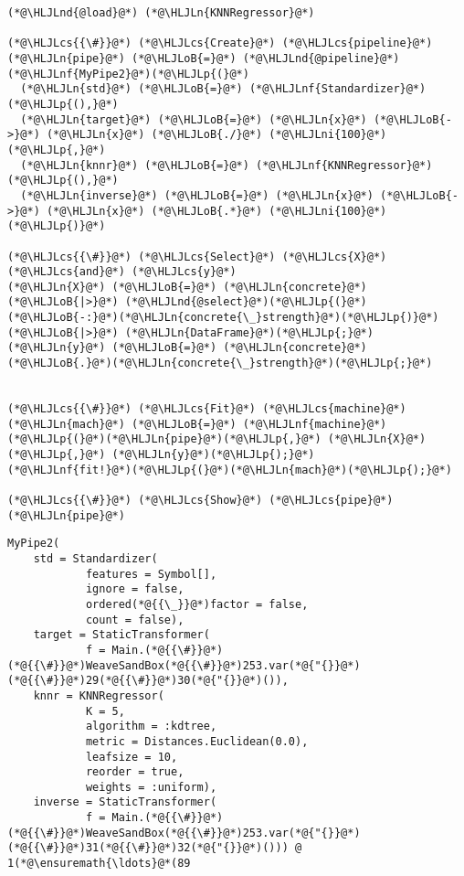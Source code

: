 \documentclass[12pt,a4paper]{article}
\newcommand{\HLJLn}[1]{#1}
\newcommand{\HLJLnd}[1]{\textcolor[RGB]{214,102,97}{#1}}
\newcommand{\HLJLnf}[1]{\textcolor[RGB]{66,102,213}{#1}}
\newcommand{\HLJLni}[1]{\textcolor[RGB]{59,151,46}{#1}}
\newcommand{\HLJLoB}[1]{\textcolor[RGB]{102,102,102}{\textbf{#1}}}
\newcommand{\HLJLp}[1]{#1}
\newcommand{\HLJLcs}[1]{\textcolor[RGB]{153,153,119}{\textit{#1}}}
\begin{document}
\begin{lstlisting}
(*@\HLJLnd{@load}@*) (*@\HLJLn{KNNRegressor}@*) 

(*@\HLJLcs{{\#}}@*) (*@\HLJLcs{Create}@*) (*@\HLJLcs{pipeline}@*)
(*@\HLJLn{pipe}@*) (*@\HLJLoB{=}@*) (*@\HLJLnd{@pipeline}@*) (*@\HLJLnf{MyPipe2}@*)(*@\HLJLp{(}@*)
  (*@\HLJLn{std}@*) (*@\HLJLoB{=}@*) (*@\HLJLnf{Standardizer}@*)(*@\HLJLp{(),}@*)
  (*@\HLJLn{target}@*) (*@\HLJLoB{=}@*) (*@\HLJLn{x}@*) (*@\HLJLoB{->}@*) (*@\HLJLn{x}@*) (*@\HLJLoB{./}@*) (*@\HLJLni{100}@*)(*@\HLJLp{,}@*) 
  (*@\HLJLn{knnr}@*) (*@\HLJLoB{=}@*) (*@\HLJLnf{KNNRegressor}@*)(*@\HLJLp{(),}@*)
  (*@\HLJLn{inverse}@*) (*@\HLJLoB{=}@*) (*@\HLJLn{x}@*) (*@\HLJLoB{->}@*) (*@\HLJLn{x}@*) (*@\HLJLoB{.*}@*) (*@\HLJLni{100}@*)
(*@\HLJLp{)}@*)

(*@\HLJLcs{{\#}}@*) (*@\HLJLcs{Select}@*) (*@\HLJLcs{X}@*) (*@\HLJLcs{and}@*) (*@\HLJLcs{y}@*)
(*@\HLJLn{X}@*) (*@\HLJLoB{=}@*) (*@\HLJLn{concrete}@*) (*@\HLJLoB{|>}@*) (*@\HLJLnd{@select}@*)(*@\HLJLp{(}@*)(*@\HLJLoB{-:}@*)(*@\HLJLn{concrete{\_}strength}@*)(*@\HLJLp{)}@*) (*@\HLJLoB{|>}@*) (*@\HLJLn{DataFrame}@*)(*@\HLJLp{;}@*)
(*@\HLJLn{y}@*) (*@\HLJLoB{=}@*) (*@\HLJLn{concrete}@*)(*@\HLJLoB{.}@*)(*@\HLJLn{concrete{\_}strength}@*)(*@\HLJLp{;}@*)


(*@\HLJLcs{{\#}}@*) (*@\HLJLcs{Fit}@*) (*@\HLJLcs{machine}@*)
(*@\HLJLn{mach}@*) (*@\HLJLoB{=}@*) (*@\HLJLnf{machine}@*)(*@\HLJLp{(}@*)(*@\HLJLn{pipe}@*)(*@\HLJLp{,}@*) (*@\HLJLn{X}@*)(*@\HLJLp{,}@*) (*@\HLJLn{y}@*)(*@\HLJLp{);}@*)
(*@\HLJLnf{fit!}@*)(*@\HLJLp{(}@*)(*@\HLJLn{mach}@*)(*@\HLJLp{);}@*)

(*@\HLJLcs{{\#}}@*) (*@\HLJLcs{Show}@*) (*@\HLJLcs{pipe}@*)
(*@\HLJLn{pipe}@*)
\end{lstlisting}

\begin{lstlisting}
MyPipe2(
    std = Standardizer(
            features = Symbol[],
            ignore = false,
            ordered(*@{{\_}}@*)factor = false,
            count = false),
    target = StaticTransformer(
            f = Main.(*@{{\#}}@*)(*@{{\#}}@*)WeaveSandBox(*@{{\#}}@*)253.var(*@{"{}}@*)(*@{{\#}}@*)29(*@{{\#}}@*)30(*@{"{}}@*)()),
    knnr = KNNRegressor(
            K = 5,
            algorithm = :kdtree,
            metric = Distances.Euclidean(0.0),
            leafsize = 10,
            reorder = true,
            weights = :uniform),
    inverse = StaticTransformer(
            f = Main.(*@{{\#}}@*)(*@{{\#}}@*)WeaveSandBox(*@{{\#}}@*)253.var(*@{"{}}@*)(*@{{\#}}@*)31(*@{{\#}}@*)32(*@{"{}}@*)())) @ 1(*@\ensuremath{\ldots}@*(89
\end{lstlisting}
\end{document}
